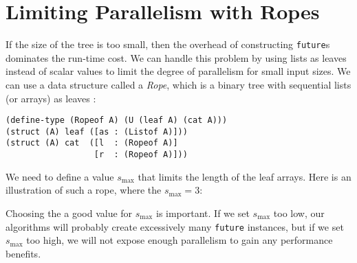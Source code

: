 \documentclass{article}
\begin{document}
\section{Limiting Parallelism with Ropes}

If the size of the tree is too small, then the overhead of constructing \lstinline{future}s dominates the run-time cost. We can handle this problem by using lists as leaves instead of scalar values to limit the degree of parallelism for small input sizes. We can use a data structure called a \emph{Rope}, which is a binary tree with sequential lists (or arrays) as leaves \cite{Boehm1995Ropes}:

\begin{lstlisting}
(define-type (Ropeof A) (U (leaf A) (cat A)))
(struct (A) leaf ([as : (Listof A)]))
(struct (A) cat  ([l  : (Ropeof A)]
                  [r  : (Ropeof A)]))
\end{lstlisting}

We need to define a value $s_{\max}$ that limits the length of the leaf arrays. Here is an illustration of such a rope, where the $s_{\max} = 3$:

\begin{center}
\end{center}

Choosing the a good value for $s_{\max}$ is important. If we set $s_{\max}$ too low, our algorithms will probably create excessively many \lstinline{future} instances, but if we set $s_{\max}$ too high, we will not expose enough parallelism to gain any performance benefits.
\end{document}
